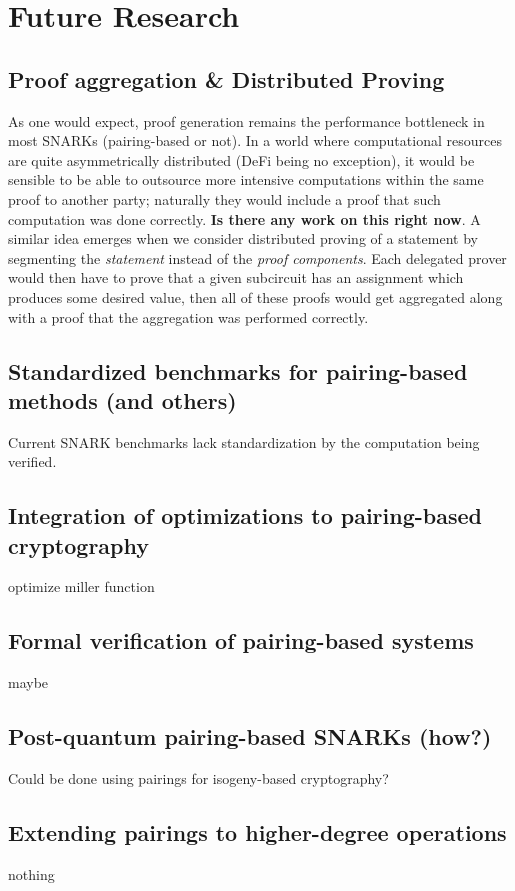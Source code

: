 \section{Future Research}

\subsection{Proof aggregation \& Distributed Proving}
\noindent As one would expect, proof generation remains the performance bottleneck in most SNARKs (pairing-based or not). In a world where computational resources are quite asymmetrically distributed (DeFi being no exception), it would be sensible to be able to outsource more intensive computations within the same proof to another party; naturally they would include a proof that such computation was done correctly. \textbf{Is there any work on this right now}. A similar idea emerges when we consider distributed proving of a statement by segmenting the \textit{statement} instead of the \textit{proof components}. Each delegated prover would then have to prove that a given subcircuit has an assignment which produces some desired value, then all of these proofs would get aggregated along with a proof that the aggregation was performed correctly.\\

\subsection{Standardized benchmarks for pairing-based methods (and others)}
\noindent Current SNARK benchmarks lack standardization by the computation being verified.\\

\subsection{Integration of optimizations to pairing-based cryptography}
\noindent optimize miller function\\

\subsection{Formal verification of pairing-based systems}
\noindent maybe\\

\subsection{Post-quantum pairing-based SNARKs (how?)}
\noindent Could be done using pairings for isogeny-based cryptography?\\

\subsection{Extending pairings to higher-degree operations}
\noindent nothing\\
